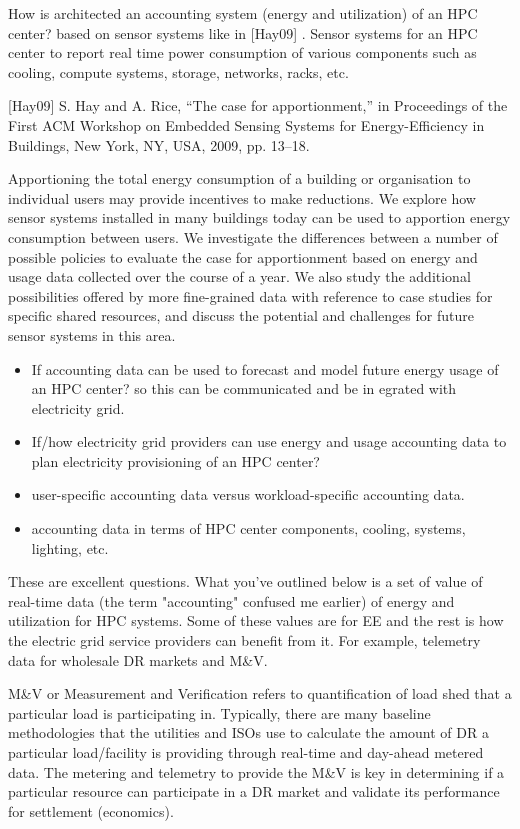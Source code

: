 \documentclass{llncs}
\begin{document}
How is architected an accounting system (energy and utilization) of an HPC
center? based on sensor systems like in [Hay09] . Sensor systems for an HPC
center to report real time power consumption of various components such as
cooling, compute systems, storage, networks, racks, etc.

[Hay09] S. Hay and A. Rice, ``The case for apportionment,'' in Proceedings
of the First ACM Workshop on Embedded Sensing Systems for Energy-Efficiency
in Buildings, New York, NY, USA, 2009, pp. 13--18.

Apportioning the total energy consumption of a building or organisation to
individual users may provide incentives to make reductions. We explore how
sensor systems installed in many buildings today can be used to apportion
energy consumption between users. We investigate the differences between a
number of possible policies to evaluate the case for apportionment based on
energy and usage data collected over the course of a year. We also study the
additional possibilities offered by more fine-grained data with reference to
case studies for specific shared resources, and discuss the potential and
challenges for future sensor systems in this area.

\begin{itemize}
\item If accounting data can be used to forecast and model future energy usage of an HPC center? so this can be communicated and be in
egrated with electricity grid.
\item If/how electricity grid providers can use energy and usage accounting data to plan electricity provisioning of an HPC center?
\item user-specific accounting data versus workload-specific accounting data.
\item accounting data in terms of HPC center components, cooling, systems, lighting, etc.
\end{itemize}
These are excellent questions. What you've outlined below is a set of value
of real-time data (the term "accounting" confused me earlier) of energy and
utilization for HPC systems. Some of these values are for EE and the rest is
how the electric grid service providers can benefit from it. For example,
telemetry data for wholesale DR markets and M{\&}V.

M{\&}V or Measurement and Verification refers to quantification of load shed
that a particular load is participating in. Typically, there are many
baseline methodologies that the utilities and ISOs use to calculate the
amount of DR a particular load/facility is providing through real-time and
day-ahead metered data. The metering and telemetry to provide the M{\&}V is
key in determining if a particular resource can participate in a DR market
and validate its performance for settlement (economics).
\end{document}
